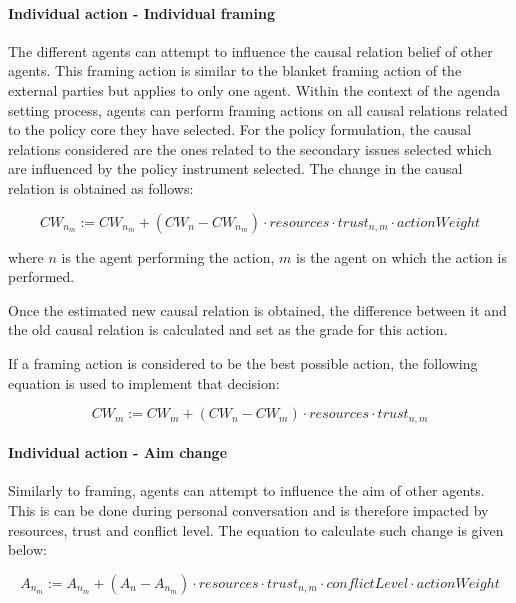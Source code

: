 \paragraph{Individual action - Individual framing}

The different agents can attempt to influence the causal relation belief of other agents. This framing action is similar to the blanket framing action of the external parties but applies to only one agent. Within the context of the agenda setting process, agents can perform framing actions on all causal relations related to the policy core they have selected.  For the policy formulation, the causal relations considered are the ones related to the secondary issues selected which are influenced by the policy instrument selected. The change in the causal relation is obtained as follows:

\begin{equation}
CW_{n_m} := CW_{n_m} + \left(CW_{n} - CW_{n_m} \right) \cdot resources \cdot trust_{n,m} \cdot actionWeight
\end{equation}

where $n$ is the agent performing the action, $m$ is the agent on which the action is performed.

Once the estimated new causal relation is obtained, the difference between it and the old causal relation is calculated and set as the grade for this action.

If a framing action is considered to be the best possible action, the following equation is used to implement that decision:

\begin{equation}
CW_{m} := CW_{m} + \left(CW_{n} - CW_{m} \right) \cdot resources \cdot trust_{n,m}
\end{equation}

\paragraph{Individual action - Aim change}

Similarly to framing, agents can attempt to influence the aim of other agents. This is can be done during personal conversation and is therefore impacted by resources, trust and conflict level. The equation to calculate such change is given below:

\begin{equation}
A_{n_m} := A_{n_m} + \left( A_{n} - A_{n_m} \right) \cdot resources \cdot trust_{n,m} \cdot conflictLevel \cdot actionWeight
\end{equation}

